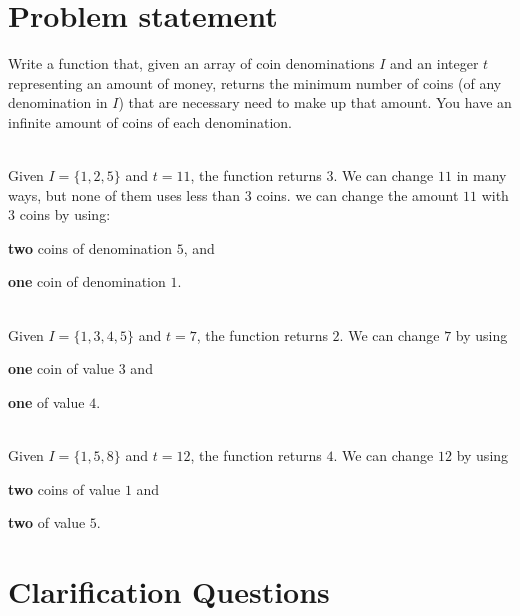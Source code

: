 \section{Problem statement}
\begin{exercise}
Write a function that, given an array of coin denominations $I$ and an integer $t$ representing an amount of money, returns
the minimum number of coins (of any denomination in $I$) that are necessary need to make up that amount. 
You have an infinite amount of coins of each denomination. 
	\begin{example}
		\label{ex:coin_change:example1}
		\hfill \\
		Given $I=\{1,2,5\}$ and $t=11$, the function returns $3$.
		We can change $11$ in many ways, but none of them uses less than $3$ coins. we can change the amount $11$ with $3$ coins by using:
		\begin{itemize*}
			\item \textbf{two} coins of denomination $5$, and
			\item \textbf{one} coin of denomination $1$.
		\end{itemize*}
	\end{example}

	\begin{example}
		\hfill \\
		Given $I=\{1,3,4,5\}$ and $t=7$, the function returns $2$.
		We can change $7$ by using 
		\begin{itemize*}
			\item \textbf{one} coin of value $3$ and
			\item \textbf{one} of value $4$.
		\end{itemize*}
	\end{example}

	\begin{example}
		\label{ex:coin_change:example3}
		\hfill \\
		Given $I=\{1,5,8\}$ and $t=12$, the function returns $4$.
		We can change $12$ by using
		\begin{itemize*}
			\item \textbf{two} coins of value $1$ and
			\item \textbf{two} of value $5$.
		\end{itemize*}
	\end{example}
\end{exercise}

\section{Clarification Questions}

